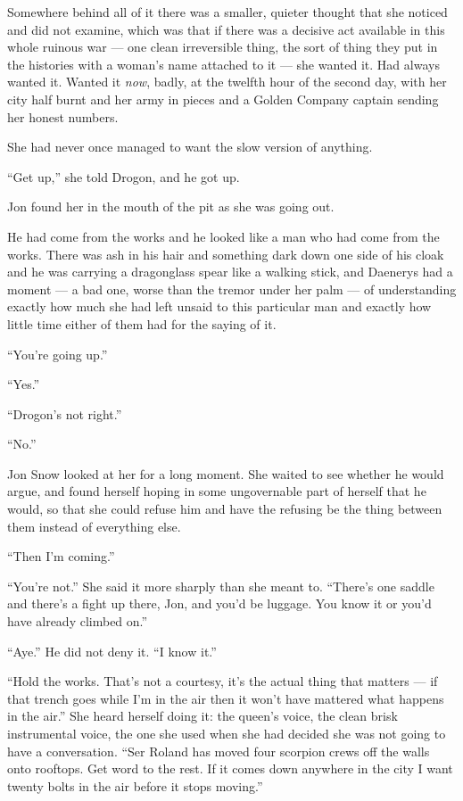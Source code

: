 Somewhere behind all of it there was a smaller, quieter thought that she noticed and did not examine, which was that if there was a decisive act available in this whole ruinous war — one clean irreversible thing, the sort of thing they put in the histories with a woman’s name attached to it — she wanted it. Had always wanted it. Wanted it \textit{now}, badly, at the twelfth hour of the second day, with her city half burnt and her army in pieces and a Golden Company captain sending her honest numbers.

She had never once managed to want the slow version of anything.

“Get up,” she told Drogon, and he got up.

\sceneBreak

Jon found her in the mouth of the pit as she was going out.

He had come from the works and he looked like a man who had come from the works. There was ash in his hair and something dark down one side of his cloak and he was carrying a dragonglass spear like a walking stick, and Daenerys had a moment — a bad one, worse than the tremor under her palm — of understanding exactly how much she had left unsaid to this particular man and exactly how little time either of them had for the saying of it.

“You’re going up.”

“Yes.”

“Drogon’s not right.”

“No.”

Jon Snow looked at her for a long moment. She waited to see whether he would argue, and found herself hoping in some ungovernable part of herself that he would, so that she could refuse him and have the refusing be the thing between them instead of everything else.

“Then I’m coming.”

“You’re not.” She said it more sharply than she meant to. “There’s one saddle and there’s a fight up there, Jon, and you’d be luggage. You know it or you’d have already climbed on.”

“Aye.” He did not deny it. “I know it.”

“Hold the works. That’s not a courtesy, it’s the actual thing that matters — if that trench goes while I’m in the air then it won’t have mattered what happens in the air.” She heard herself doing it: the queen’s voice, the clean brisk instrumental voice, the one she used when she had decided she was not going to have a conversation. “Ser Roland has moved four scorpion crews off the walls onto rooftops. Get word to the rest. If it comes down anywhere in the city I want twenty bolts in the air before it stops moving.”

